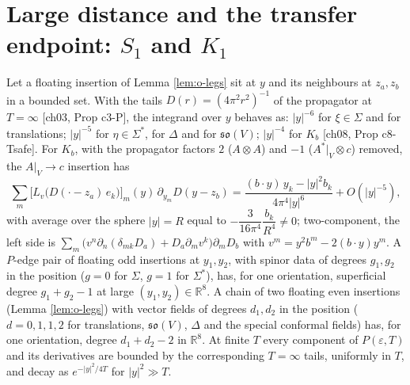 \section{Large distance and the transfer endpoint: $S_1$ and $K_1$}

\begin{proposition}
\label{prop:o-ir}
Let a floating insertion of Lemma \ref{lem:o-legs} sit at $y$ and its neighbours at $z_a,z_b$ in a bounded set. With the tails $D(r)=(4\pi^2r^2)^{-1}$ of the propagator at $T=\infty$ [ch03, Prop c3-P], the integrand over $y$ behaves as: $|y|^{-6}$ for $\xi\in\Sigma$ and for translations; $|y|^{-5}$ for $\eta\in\Sigma^*$, for $\Delta$ and for $\mathfrak{so}(V)$; $|y|^{-4}$ for $K_b$ [ch08, Prop c8-Tsafe]. For $K_b$, with the propagator factors $2$ ($A\otimes A$) and $-1$ ($A^*|_V\otimes c$) removed, the $A|_V\to c$ insertion has
\begin{equation}
\sum_m\big[L_v\big(D(\cdot-z_a)\,e_k\big)\big]_m(y)\,\partial_{y_m}D(y-z_b)=\frac{(b\cdot y)\,y_k-|y|^2b_k}{4\pi^4|y|^6}+O(|y|^{-5}),
\label{eq:o-Kir}
\end{equation}
with average over the sphere $|y|=R$ equal to $-\dfrac{3}{16\pi^4}\dfrac{b_k}{R^4}\neq0$; two-component, the left side is $\sum_m\big(v^n\partial_n(\delta_{mk}D_a)+D_a\partial_mv^k\big)\partial_mD_b$ with $v^m=y^2b^m-2(b\cdot y)y^m$. A $P$-edge pair of floating odd insertions at $y_1,y_2$, with spinor data of degrees $g_1,g_2$ in the position ($g=0$ for $\Sigma$, $g=1$ for $\Sigma^*$), has, for one orientation, superficial degree $g_1+g_2-1$ at large $(y_1,y_2)\in\mathbb R^8$. A chain of two floating even insertions (Lemma \ref{lem:o-legs}) with vector fields of degrees $d_1,d_2$ in the position ($d=0,1,1,2$ for translations, $\mathfrak{so}(V)$, $\Delta$ and the special conformal fields) has, for one orientation, degree $d_1+d_2-2$ in $\mathbb R^8$. At finite $T$ every component of $P(\varepsilon,T)$ and its derivatives are bounded by the corresponding $T=\infty$ tails, uniformly in $T$, and decay as $e^{-|y|^2/4T}$ for $|y|^2\gg T$.
\end{proposition}

